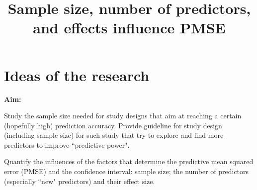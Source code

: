 \documentclass[11pt]{article}
\begin{document}
\thispagestyle{fancy}

\title{\bf Sample size, number of predictors, and effects influence PMSE}
\date{}
\maketitle
% 
%
%
%
%
%

\section{Ideas of the research}%

{\bf Aim:}

Study the sample size needed for study designs that aim at reaching a certain (hopefully high) prediction accuracy. Provide guideline for study design (including sample size) for such study that try to explore and find more predictors to improve ``predictive power". 


Quantify the influences of the factors that determine the predictive mean squared error (PMSE) and the confidence interval: sample size; the number of predictors (especially ``new" predictors) and their effect size.

    
    
\end{document}
